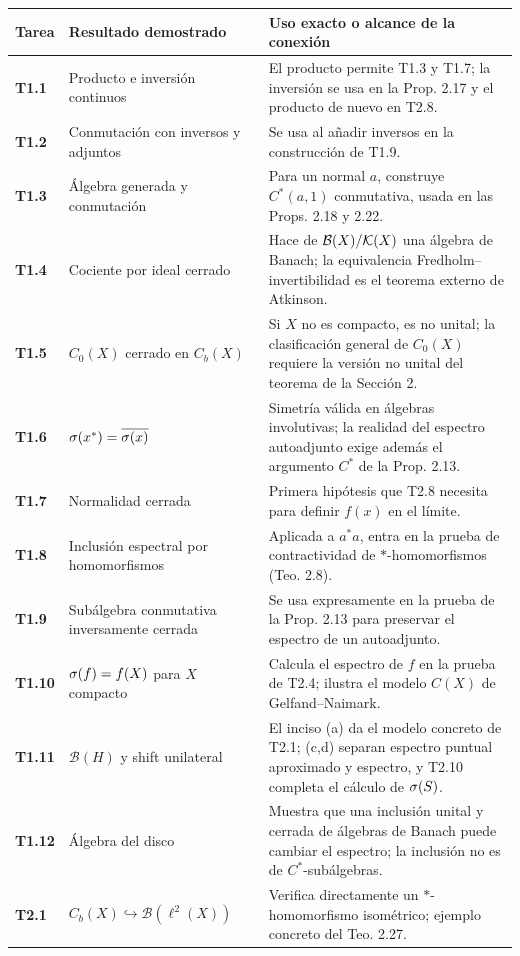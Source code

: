 \small
\begin{longtable}{>{\bfseries}p{1.3cm}p{4.3cm}p{8.2cm}}
\toprule
Tarea & Resultado demostrado & Uso exacto o alcance de la conexión\\
\midrule
\endhead
T1.1 & Producto e inversión continuos & El producto permite T1.3 y T1.7; la inversión se usa en la Prop. 2.17 y el producto de nuevo en T2.8.\\
T1.2 & Conmutación con inversos y adjuntos & Se usa al añadir inversos en la construcción de T1.9.\\
T1.3 & Álgebra generada y conmutación & Para un normal $a$, construye $C^*(a,1)$ conmutativa, usada en las Props. 2.18 y 2.22.\\
T1.4 & Cociente por ideal cerrado & Hace de $\mathcal B(X)/\mathcal K(X)$ una álgebra de Banach; la equivalencia Fredholm--invertibilidad es el teorema externo de Atkinson.\\
T1.5 & $C_0(X)$ cerrado en $C_b(X)$ & Si $X$ no es compacto, es no unital; la clasificación general de $C_0(X)$ requiere la versión no unital del teorema de la Sección 2.\\
T1.6 & $\sigma(x^*)=\overline{\sigma(x)}$ & Simetría válida en álgebras involutivas; la realidad del espectro autoadjunto exige además el argumento $C^*$ de la Prop. 2.13.\\
T1.7 & Normalidad cerrada & Primera hipótesis que T2.8 necesita para definir $f(x)$ en el límite.\\
T1.8 & Inclusión espectral por homomorfismos & Aplicada a $a^*a$, entra en la prueba de contractividad de $*$-homomorfismos (Teo. 2.8).\\
T1.9 & Subálgebra conmutativa inversamente cerrada & Se usa expresamente en la prueba de la Prop. 2.13 para preservar el espectro de un autoadjunto.\\
T1.10 & $\sigma(f)=f(X)$ para $X$ compacto & Calcula el espectro de $f$ en la prueba de T2.4; ilustra el modelo $C(X)$ de Gelfand--Naimark.\\
T1.11 & $\mathcal B(H)$ y shift unilateral & El inciso (a) da el modelo concreto de T2.1; (c,d) separan espectro puntual aproximado y espectro, y T2.10 completa el cálculo de $\sigma(S)$.\\
T1.12 & Álgebra del disco & Muestra que una inclusión unital y cerrada de álgebras de Banach puede cambiar el espectro; la inclusión no es de $C^*$-subálgebras.\\
\midrule
T2.1 & $C_b(X)\hookrightarrow\mathcal B(\ell^2(X))$ & Verifica directamente un $*$-homomorfismo isométrico; ejemplo concreto del Teo. 2.27.\\

\end{longtable}
